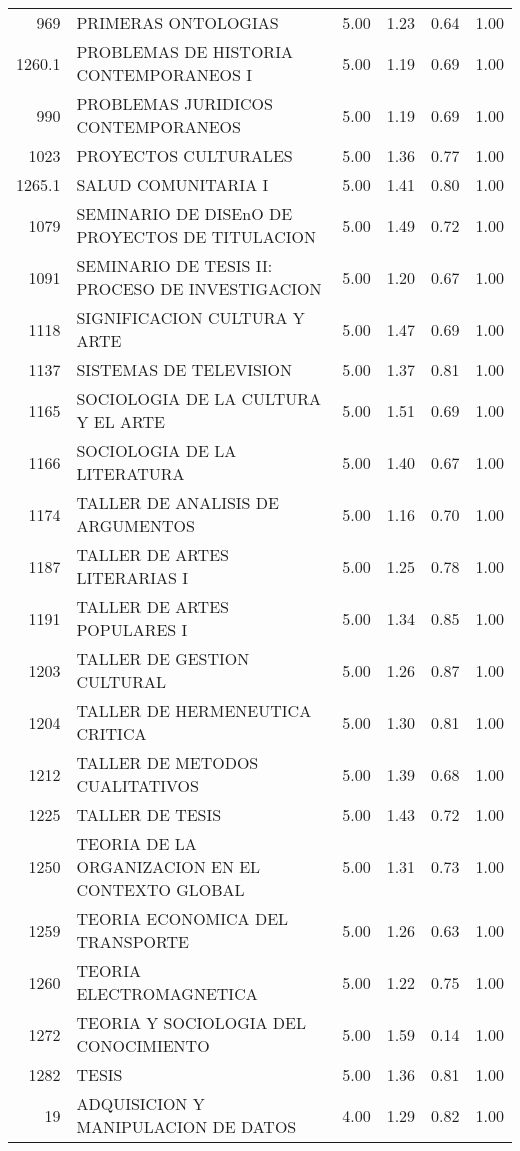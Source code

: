 \documentclass[12pt]{article}
\begin{document}
\begin{table}[ht]
\begin{tabular}{rlrrrr}
  969 & PRIMERAS ONTOLOGIAS & 5.00 & 1.23 & 0.64 & 1.00 \\ 
  1260.1 & PROBLEMAS DE HISTORIA CONTEMPORANEOS I & 5.00 & 1.19 & 0.69 & 1.00 \\ 
  990 & PROBLEMAS JURIDICOS CONTEMPORANEOS & 5.00 & 1.19 & 0.69 & 1.00 \\ 
  1023 & PROYECTOS CULTURALES & 5.00 & 1.36 & 0.77 & 1.00 \\ 
  1265.1 & SALUD COMUNITARIA I & 5.00 & 1.41 & 0.80 & 1.00 \\ 
  1079 & SEMINARIO DE DISEnO DE PROYECTOS DE TITULACION & 5.00 & 1.49 & 0.72 & 1.00 \\ 
  1091 & SEMINARIO DE TESIS II: PROCESO DE INVESTIGACION & 5.00 & 1.20 & 0.67 & 1.00 \\ 
  1118 & SIGNIFICACION CULTURA Y ARTE & 5.00 & 1.47 & 0.69 & 1.00 \\ 
  1137 & SISTEMAS DE TELEVISION & 5.00 & 1.37 & 0.81 & 1.00 \\ 
  1165 & SOCIOLOGIA DE LA CULTURA Y EL ARTE & 5.00 & 1.51 & 0.69 & 1.00 \\ 
  1166 & SOCIOLOGIA DE LA LITERATURA & 5.00 & 1.40 & 0.67 & 1.00 \\ 
  1174 & TALLER DE ANALISIS DE ARGUMENTOS & 5.00 & 1.16 & 0.70 & 1.00 \\ 
  1187 & TALLER DE ARTES LITERARIAS I & 5.00 & 1.25 & 0.78 & 1.00 \\ 
  1191 & TALLER DE ARTES POPULARES I & 5.00 & 1.34 & 0.85 & 1.00 \\ 
  1203 & TALLER DE GESTION CULTURAL & 5.00 & 1.26 & 0.87 & 1.00 \\ 
  1204 & TALLER DE HERMENEUTICA CRITICA & 5.00 & 1.30 & 0.81 & 1.00 \\ 
  1212 & TALLER DE METODOS CUALITATIVOS & 5.00 & 1.39 & 0.68 & 1.00 \\ 
  1225 & TALLER DE TESIS & 5.00 & 1.43 & 0.72 & 1.00 \\ 
  1250 & TEORIA DE LA ORGANIZACION EN EL CONTEXTO GLOBAL & 5.00 & 1.31 & 0.73 & 1.00 \\ 
  1259 & TEORIA ECONOMICA DEL TRANSPORTE & 5.00 & 1.26 & 0.63 & 1.00 \\ 
  1260 & TEORIA ELECTROMAGNETICA & 5.00 & 1.22 & 0.75 & 1.00 \\ 
  1272 & TEORIA Y SOCIOLOGIA DEL CONOCIMIENTO & 5.00 & 1.59 & 0.14 & 1.00 \\ 
  1282 & TESIS & 5.00 & 1.36 & 0.81 & 1.00 \\ 
  19 & ADQUISICION Y MANIPULACION DE DATOS & 4.00 & 1.29 & 0.82 & 1.00 \\ 

\end{tabular}
\end{table}
\end{document}
